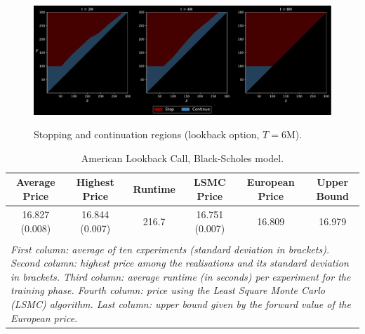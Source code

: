 \begin{figure}[H]
    \centering
    \caption{Stopping and continuation regions (lookback option, $T=6$M).}
    \includegraphics[scale = 0.42]{Figures/Best Lookback Call, d = 1, N = 126, lbda = -0.23, no rdm.pdf}
    \label{fig:asymCall}
    
    \scriptsize{
\textit{
}}
\end{figure}


\begin{table}[ht]
  \centering
  \caption{American Lookback Call, Black-Scholes model.  
 }
 
 \vspace{-2mm}
 
  \begin{tabular}{cccccc}
 \hline \hline
    Average Price  & Highest Price & Runtime  & LSMC Price & European Price & Upper Bound\\
  \hline  \hline 
  16.827   (0.008)  &  16.844 (0.007) & 216.7 & 16.751 (0.007) &  16.809 & 16.979 \\
  \hline \\[-1em]
  \multicolumn{6}{l}{%
  \begin{minipage}{14cm}%
    \tiny \textit{First  column:  average  of ten experiments (standard deviation in brackets). Second column: highest price  among the realisations and its standard deviation in brackets.  Third column:  average runtime (in seconds) per experiment for the training phase. Fourth column: price using the Least Square Monte Carlo (LSMC) algorithm. Last column: upper bound given by the forward value of the European price. }%
  \end{minipage}%
}
\end{tabular}
\vspace{2mm}
\label{tab:resultLkbk}
  \end{table}

